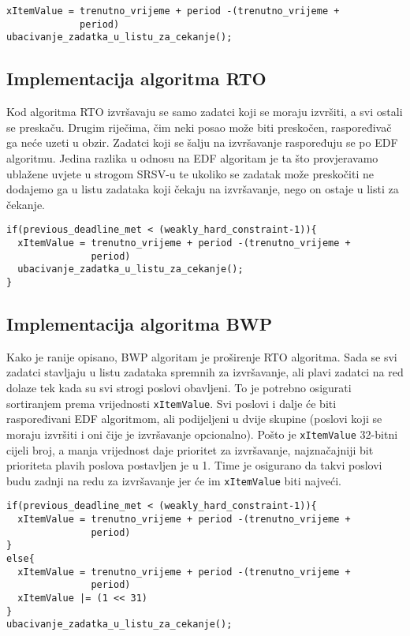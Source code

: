 \documentclass[../zavrsni.tex]{subfiles}
\begin{document}
\begin{lstlisting}[style=CStyle,caption={Pseudokod implementacije algoritma EDF},captionpos=b]
xItemValue = trenutno_vrijeme + period -(trenutno_vrijeme + 
             period)
ubacivanje_zadatka_u_listu_za_cekanje();
\end{lstlisting}


\subsection{Implementacija algoritma RTO}

Kod algoritma RTO izvršavaju se samo zadatci koji se moraju izvršiti, a svi ostali se preskaču. Drugim riječima, čim neki posao 
može biti preskočen, raspoređivač ga neće uzeti u obzir. Zadatci koji se šalju na izvršavanje raspoređuju se po EDF algoritmu. Jedina razlika u odnosu
na EDF algoritam je ta što provjeravamo ublažene uvjete u strogom SRSV-u te ukoliko se zadatak može preskočiti ne dodajemo ga u 
listu zadataka koji čekaju na izvršavanje, nego on ostaje u listi za čekanje. 

\begin{lstlisting}[style=CStyle,caption={Pseudokod implementacije algoritma RTO},captionpos=b]
if(previous_deadline_met < (weakly_hard_constraint-1)){
  xItemValue = trenutno_vrijeme + period -(trenutno_vrijeme + 
               period)
  ubacivanje_zadatka_u_listu_za_cekanje();
}
\end{lstlisting}

\subsection{Implementacija algoritma BWP}

Kako je ranije opisano, BWP algoritam je proširenje RTO algoritma. Sada se svi zadatci stavljaju u listu zadataka spremnih za izvršavanje,
ali plavi zadatci na red dolaze tek kada su svi strogi poslovi obavljeni. To je potrebno osigurati sortiranjem prema vrijednosti
\texttt{xItemValue}. Svi poslovi i dalje će biti raspoređivani EDF algoritmom, ali podijeljeni u dvije skupine (poslovi koji se moraju
izvršiti i oni čije je izvršavanje opcionalno). Pošto je \texttt{xItemValue} 32-bitni cijeli broj, a manja vrijednost daje prioritet
za izvršavanje, najznačajniji bit prioriteta plavih poslova postavljen je u 1. Time je osigurano da takvi poslovi budu 
zadnji na redu za izvršavanje jer će im \texttt{xItemValue} biti najveći.  

\begin{lstlisting}[style=CStyle,caption={Pseudokod implementacije algoritma BWP},captionpos=b]
if(previous_deadline_met < (weakly_hard_constraint-1)){
  xItemValue = trenutno_vrijeme + period -(trenutno_vrijeme + 
               period) 
}
else{
  xItemValue = trenutno_vrijeme + period -(trenutno_vrijeme + 
               period)
  xItemValue |= (1 << 31)
}
ubacivanje_zadatka_u_listu_za_cekanje();
\end{lstlisting}
\end{document}
